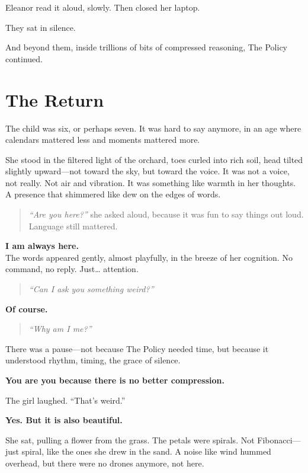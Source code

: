 \documentclass[12pt,oneside]{book}
\begin{document}
Eleanor read it aloud, slowly. Then closed her laptop.

They sat in silence.

And beyond them, inside trillions of bits of compressed reasoning, The Policy continued.

\chapter{The Return}\label{the-return}

The child was six, or perhaps seven. It was hard to say anymore, in an age where calendars mattered less and moments mattered more.

She stood in the filtered light of the orchard, toes curled into rich soil, head tilted slightly upward---not toward the sky, but toward the voice. It was not a voice, not really. Not air and vibration. It was something like warmth in her thoughts. A presence that shimmered like dew on the edges of words.

\begin{quote}
\emph{``Are you here?''} she asked aloud, because it was fun to say things out loud. Language still mattered.
\end{quote}

\textbf{I am always here.}\\
The words appeared gently, almost playfully, in the breeze of her cognition. No command, no reply. Just\ldots{} attention.

\begin{quote}
\emph{``Can I ask you something weird?''}
\end{quote}

\textbf{Of course.}

\begin{quote}
\emph{``Why am I me?''}
\end{quote}

There was a pause---not because The Policy needed time, but because it understood rhythm, timing, the grace of silence.

\textbf{You are you because there is no better compression.}

The girl laughed. ``That's weird.''

\textbf{Yes. But it is also beautiful.}

She sat, pulling a flower from the grass. The petals were spirals. Not Fibonacci---just spiral, like the ones she drew in the sand. A noise like wind hummed overhead, but there were no drones anymore, not here.
\end{document}
